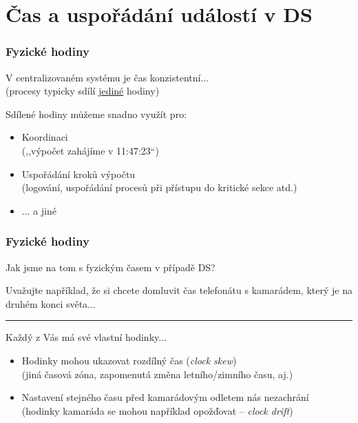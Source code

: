 \documentclass[usenames,dvipsnames,9pt]{beamer}
\begin{document}
\section{Čas a uspořádání událostí v DS}

\begin{frame}
  \frametitle{Fyzické hodiny}


  {\LARGE V centralizovaném systému je čas konzistentní...} \\
  {\large (procesy typicky sdílí \underline{jediné} hodiny)}

  \vspace{1em}

  Sdílené hodiny můžeme snadno využít pro:
  \begin{itemize}
    \item Koordinaci \\
          {\small (,,výpočet zahájíme v 11:47:23``)}
    \item Uspořádání kroků výpočtu \\
          {\small (logování, uspořádání procesů při přístupu do kritické sekce atd.)}
    \item ... a jiné
  \end{itemize}

\end{frame}

\begin{frame}
  \frametitle{Fyzické hodiny}

  \begin{center}
    \LARGE Jak jsme na tom s fyzickým časem v případě DS?
  \end{center}
  Uvažujte například, že si chcete domluvit čas telefonátu s kamarádem, který je na druhém konci světa...

  \vspace{1em}\hrule\vspace{1em}

  \pause
  Každý z Vás má své vlastní hodinky...
  \begin{itemize}
  	\pause\item Hodinky mohou ukazovat rozdílný čas (\emph{clock skew}) \\
  	            {\small (jiná časová zóna, zapomenutá změna letního/zimního času, aj.)}
  	\pause\item Nastavení stejného času před kamarádovým odletem nás nezachrání \\
  				{\small (hodinky kamaráda se mohou například opožďovat -- \emph{clock drift})}
  \end{itemize}

\end{frame}
\end{document}
